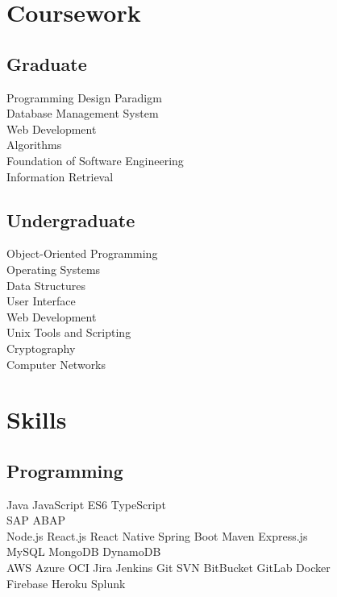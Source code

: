 \documentclass[]{deedy-resume-openfont}
\begin{document}
\begin{minipage}[t]{0.33\textwidth}

\section{Coursework}
\subsection{Graduate}
Programming Design Paradigm \\
Database Management System \\
Web Development \\
Algorithms \\
Foundation of Software Engineering \\
Information Retrieval \\
\sectionsep

\subsection{Undergraduate}
Object-Oriented Programming \\
Operating Systems \\
Data Structures \\
User Interface \\
Web Development \\
Unix Tools and Scripting \\
Cryptography \\
Computer Networks\\


\section{Skills}
\subsection{Programming}
Java \textbullet{} JavaScript ES6
 \textbullet{}  TypeScript\\ \textbullet{} SAP ABAP\\ 
Node.js \textbullet{} React.js \textbullet{} React Native \textbullet{} Spring Boot \textbullet{} Maven \textbullet{} Express.js\\
MySQL \textbullet{} MongoDB \textbullet{} DynamoDB\\
AWS \textbullet{} Azure \textbullet{} OCI \textbullet{}
Jira \textbullet{} Jenkins \textbullet{} Git \textbullet{} SVN \textbullet{} BitBucket \textbullet{} GitLab \textbullet{} Docker\\ \textbullet{} Firebase \textbullet{} Heroku \textbullet{} Splunk\\
\sectionsep

%
%

\end{minipage} 
\end{document}
